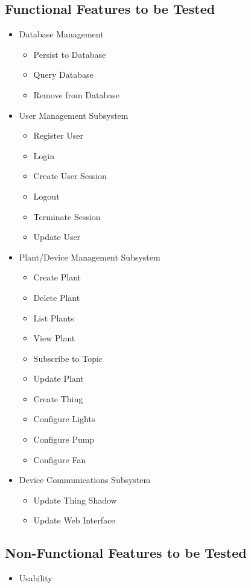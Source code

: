 \documentclass{article}
\begin{document}
	\subsection{Functional Features to be Tested}
		\begin{itemize}
			\item Database Management
				 \begin{itemize}
				 	\item Persist to Database
				 	\item Query Database
				 	\item Remove from Database
				 \end{itemize}
			\item User Management Subsystem
				\begin{itemize}
					\item Register User
					\item Login
					\item Create User Session
					\item Logout
					\item Terminate Session
					\item Update User
				\end{itemize}
			\item Plant/Device Management Subsystem
				\begin{itemize}
					\item Create Plant
					\item Delete Plant
					\item List Plants
					\item View Plant
					\item Subscribe to Topic
					\item Update Plant
					\item Create Thing
					\item Configure Lights
					\item Configure Pump
					\item Configure Fan
				\end{itemize}
			\item Device Communications Subsystem
				\begin{itemize}
					\item Update Thing Shadow
					\item Update Web Interface
				\end{itemize}
		\end{itemize}
	\subsection{Non-Functional Features to be Tested}
		\begin{itemize}
			\item Usability
		\end{itemize}
		
\end{document}
